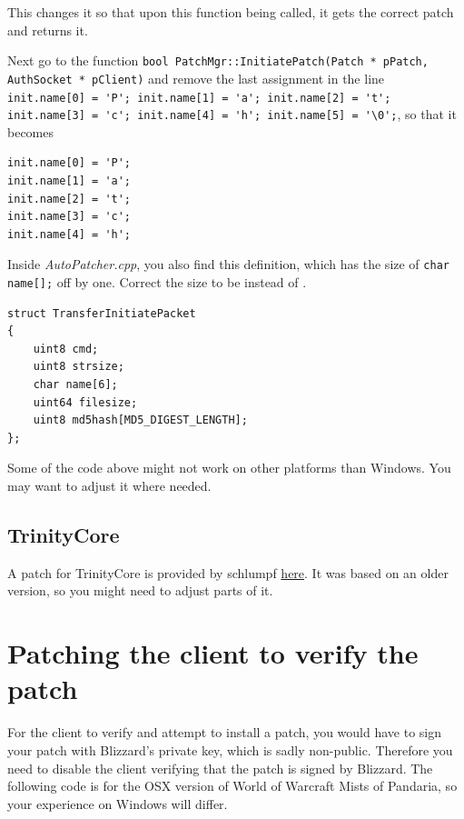 \documentclass{article}
\newcommand{\wow}{World of Warcraft\xspace}
\newcommand{\blizzard}{Blizzard\xspace}
\newcommand{\file}[1]{\emph{#1}\xspace}
\begin{document}


This changes it so that upon this function being called, it gets the correct patch and returns it.

Next go to the function \lstinline{bool PatchMgr::InitiatePatch(Patch * pPatch, AuthSocket * pClient)} and remove the last assignment in the line \lstinline{init.name[0] = 'P'; init.name[1] = 'a'; init.name[2] = 't'; init.name[3] = 'c'; init.name[4] = 'h'; init.name[5] = '\0';}, so that it becomes
\begin{lstlisting}
init.name[0] = 'P';
init.name[1] = 'a';
init.name[2] = 't';
init.name[3] = 'c';
init.name[4] = 'h';
\end{lstlisting}

Inside \file{AutoPatcher.cpp}, you also find this definition, which has the size of \lstinline{char name[];} off by one. Correct the size to be  instead of .
\begin{lstlisting}
struct TransferInitiatePacket
{
	uint8 cmd;
	uint8 strsize;
	char name[6];
	uint64 filesize;
	uint8 md5hash[MD5_DIGEST_LENGTH];
};
\end{lstlisting}

Some of the code above might not work on other platforms than Windows. You may want to adjust it where needed.

\subsection{TrinityCore}

A patch for TrinityCore is provided by schlumpf \href{http://pastebin.com/0BwqxVGf}{here}. It was based on an older version, so you might need to adjust parts of it.

\section{Patching the client to verify the patch}

For the client to verify and attempt to install a patch, you would have to sign your patch with \blizzard's private key, which is sadly non-public. Therefore you need to disable the client verifying that the patch is signed by \blizzard. The following code is for the OSX version of \wow Mists of Pandaria, so your experience on Windows will differ.
\end{document}
